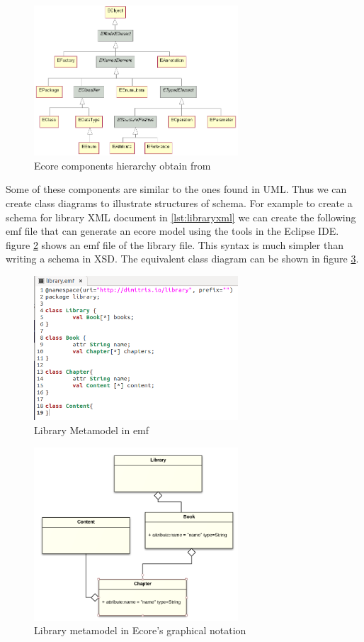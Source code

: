 \documentclass{report}
\begin{document}
\begin{figure}[H]
\centering
\includegraphics[width=3in]{EcoreHierarchy}%
\caption{Ecore components hierarchy obtain from \cite{ecorehierarchy}}%
\label{fig:ecorehierarchy}%
\end{figure}

Some of these components are similar to the ones found in UML. Thus we can create class diagrams to illustrate structures of schema. For example to create a schema for library XML document in \ref{lst:libraryxml} we can create the following emf file that can generate an ecore model using the tools in the Eclipse IDE.
figure \ref{fig:libraryemf} shows an emf file of the library file. This syntax is much simpler than writing a schema in XSD. The equivalent class diagram can be shown in figure \ref{fig:libraryclass}. 

\begin{multicols}{2}
\begin{figure}[H]
\centering
\includegraphics[width=3in]{libraryemf}%
\caption{Library Metamodel in emf}%
\label{fig:libraryemf}%
\end{figure}
\begin{figure}[H]
\centering
\includegraphics[width=3in]{libraryclass}%
\caption{Library metamodel in Ecore's graphical notation}%
\label{fig:libraryclass}%
\end{figure}
\end{multicols}
\end{document}
